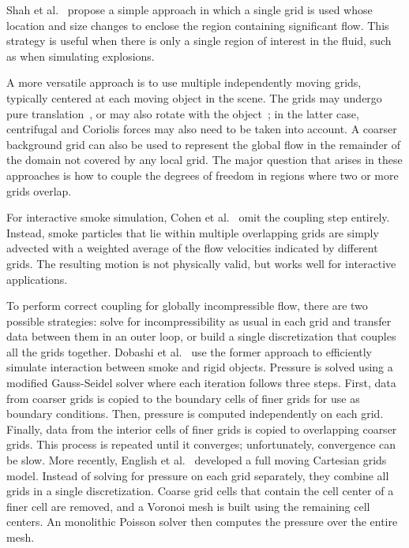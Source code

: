 Shah et al.~\cite{Shah2004} propose a simple approach in which a single grid is used whose location and size changes to enclose the region containing significant flow.
This strategy is useful when there is only a single region of interest in the fluid, such as when simulating explosions.

A more versatile approach is to use multiple independently moving grids, typically centered at each moving object in the scene.
The grids may undergo pure translation~\cite{Cohen2010}, or may also rotate with the object~\cite{Dobashi2008:adaptiveGrid,English2013}; in the latter case, centrifugal and Coriolis forces may also need to be taken into account.
A coarser background grid can also be used to represent the global flow in the remainder of the domain not covered by any local grid.
The major question that arises in these approaches is how to couple the degrees of freedom in regions where two or more grids overlap.

For interactive smoke simulation, Cohen et al.~\cite{Cohen2010} omit the coupling step entirely.
Instead, smoke particles that lie within multiple overlapping grids are simply advected with a weighted average of the flow velocities indicated by different grids.
The resulting motion is not physically valid, but works well for interactive applications.

To perform correct coupling for globally incompressible flow, there are two possible strategies: solve for incompressibility as usual in each grid and transfer data between them in an outer loop, or build a single discretization that couples all the grids together.
Dobashi et al.~\cite{Dobashi2008:adaptiveGrid} use the former approach to efficiently simulate interaction between smoke and rigid objects. Pressure is solved using a modified Gauss-Seidel solver where each iteration follows three steps.
First, data from coarser grids is copied to the boundary cells of finer grids for use as boundary conditions.
Then, pressure is computed independently on each grid.
Finally, data from the interior cells of finer grids is copied to overlapping coarser grids.
This process is repeated until it converges; unfortunately, convergence can be slow.
More recently, English et al.~\cite{English2013} developed a full moving Cartesian grids model.
Instead of solving for pressure on each grid separately, they combine all grids in a single discretization.
Coarse grid cells that contain the cell center of a finer cell are removed, and a Voronoi mesh is built using the remaining cell centers.
An monolithic Poisson solver then computes the pressure over the entire mesh.

